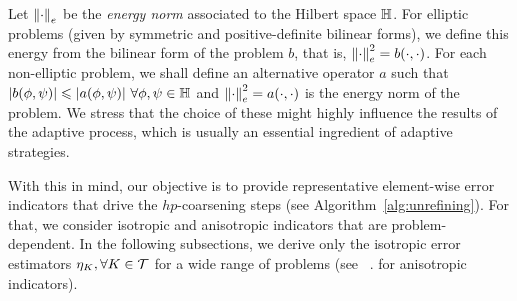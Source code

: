 {{{%
%

Let $\left\|\cdot\right\|_e$ be the \emph{energy norm} associated to the Hilbert space $\mathbb{H}$. For elliptic problems (given by symmetric and positive-definite bilinear forms), we define this energy from the bilinear form of the problem $b$, that is, $\left\|\cdot\right\|_e^2 =b(\cdot, \cdot)$. For each non-elliptic problem, we shall define an alternative operator $a$  such that $\left|b(\phi, \psi)\right| \leqslant \left|a(\phi, \psi)\right| \, \forall \phi, \psi \in \mathbb{H}$ and $\left\|\cdot\right\|_e^2 =a(\cdot, \cdot)$ is the energy norm of the problem. We stress that the choice of these  might highly influence the results of the adaptive process, which is usually an essential ingredient of adaptive strategies.


With this in mind, our objective is to provide representative element-wise error indicators that drive the $hp$-coarsening steps (see Algorithm~\ref{alg:unrefining}). For that, we consider isotropic and anisotropic indicators that are problem-dependent. In the following subsections, we derive only the isotropic error estimators $\eta_K, \forall K \in \mathcal{T}$ for a wide range of problems (see ~\cite{darrigrand2020painless}. for anisotropic indicators).

}}}
